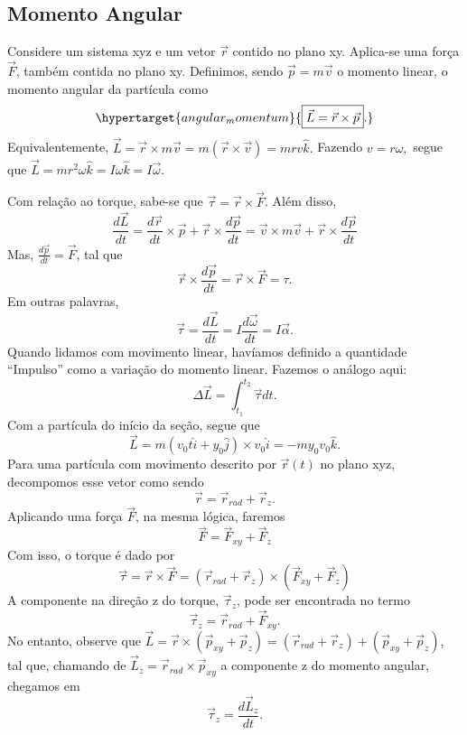 \documentclass{article}
\begin{document}
\subsection{Momento Angular}
Considere um sistema xyz e um vetor \(\vec{r}\) contido no plano xy. Aplica-se uma força \(\vec{F}\), também contida no plano xy. 
Definimos, sendo \(\vec{p} = m \vec{v}\) o momento linear, o momento angular da partícula como 
\[
  \hypertarget{angular_momentum}{\boxed{\vec{L} = \vec{r}\times \vec{p}}.}
\]
Equivalentemente, \(\vec{L} = \vec{r}\times m \vec{v} = m(\vec{r}\times \vec{v}) = mrv\hat{k}.\) Fazendo
\(v = r\omega,\) segue que \(\vec{L} = mr^{2}\omega \hat{k} = I\omega \hat{k} = I \vec{\omega }\). 

Com relação ao torque, sabe-se que \(\vec{\tau} = \vec{r}\times \vec{F}\). Além disso, 
\[
  \frac{d \vec{L}}{dt} = \frac{d \vec{r}}{dt}\times \vec{p} + \vec{r} \times \frac{d \vec{p}}{dt} = \vec{v}\times m \vec{v} + \vec{r}\times \frac{d \vec{p}}{dt}
\]
Mas, \(\frac{d \vec{p}}{dt} = \vec{F}\), tal que 
\[
  \vec{r} \times \frac{d \vec{p}}{dt} = \vec{r}\times \vec{F} = \tau.
\]
Em outras palavras, 
\[
  \vec{\tau } = \frac{d \vec{L}}{dt} = I \frac{d \vec{\omega }}{dt} = I \vec{\alpha }.
\]
Quando lidamos com movimento linear, havíamos definido a quantidade ``Impulso'' como a variação do momento linear. Fazemos o análogo aqui: 
\[
  \Delta \vec{L} = \int_{t_{1}}^{t_{2}}\vec{\tau }dt.
\]
Com a partícula do início da seção, segue que 
\[
  \vec{L} = m(v_{0}t\hat{i} + y_{0}\hat{j})\times v_{0}\hat{i} = -my_{0}v_{0}\hat{k}.
\]
Para uma partícula com movimento descrito por \(\vec{r}(t)\) no plano xyz, decompomos esse vetor como sendo 
\[
  \vec{r} = \vec{r}_{rad} + \vec{r}_{z}.
\]
Aplicando uma força \(\vec{F}\), na mesma lógica, faremos 
\[
  \vec{F} = \vec{F}_{xy} + \vec{F}_{z}
\]
Com isso, o torque é dado por 
\[
  \vec{\tau } = \vec{r}\times \vec{F} = (\vec{r}_{rad} + \vec{r}_{z})\times(\vec{F}_{xy} + \vec{F}_{z})
\]
A componente na direção z do torque, \(\vec{\tau }_{z}\), pode ser encontrada no termo 
\[
  \vec{\tau }_{z} = \vec{r}_{rad} + \vec{F}_{xy}.
\]
No entanto, observe que \(\vec{L} = \vec{r}\times (\vec{p}_{xy} + \vec{p}_{z}) = (\vec{r}_{rad} + \vec{r}_{z}) + (\vec{p}_{xy}+\vec{p}_{z})\), tal que,
chamando de \(\vec{L}_{z} = \vec{r}_{rad}\times \vec{p}_{xy}\) a componente z do momento angular, chegamos em 
\[
  \vec{\tau }_{z} = \frac{d \vec{L}_{z}}{dt}.
\]
\end{document}
